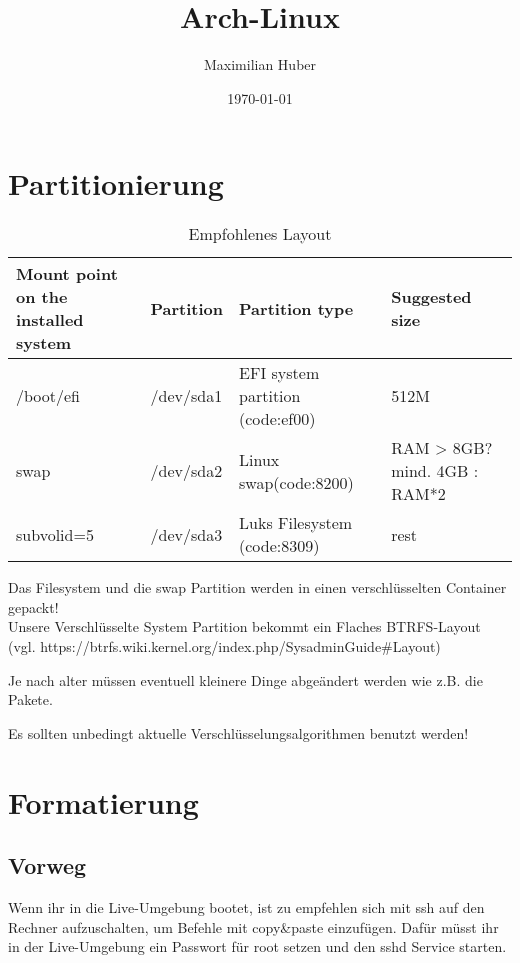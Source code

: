 \documentclass[11pt,a4paper]{article}
\author{Maximilian Huber}
\title{Arch-Linux}
\date{\today}
\begin{document}
\begin{titlepage}
\maketitle
\thispagestyle{empty}
\end{titlepage}

\tableofcontents
\thispagestyle{empty}	
\cleardoublepage
\setcounter{page}{1}

\section{Partitionierung}
\begin{table}[h]
\begin{tabular}{|p{3cm}|p{3cm}|p{3cm}| p{3cm} |}
\hline
Mount point on the installed system & Partition & Partition type   &  Suggested size \\ \hline
/boot/efi & /dev/sda1  & EFI system partition (code:ef00)  & 512M \\ \hline
swap & /dev/sda2  & Linux swap(code:8200)  & RAM > 8GB? mind. 4GB : RAM*2 \\ \hline
subvolid=5 & /dev/sda3  & Luks Filesystem (code:8309)  & rest  \\ \hline
\end{tabular}
\caption{Empfohlenes Layout}
\end{table}

Das Filesystem und die swap Partition werden in einen verschlüsselten Container gepackt!\\

Unsere Verschlüsselte System Partition bekommt ein Flaches BTRFS-Layout (vgl. https://btrfs.wiki.kernel.org/index.php/SysadminGuide\#Layout)

Je nach alter müssen eventuell kleinere Dinge abgeändert werden wie z.B. die Pakete.

Es sollten unbedingt aktuelle Verschlüsselungsalgorithmen benutzt werden!
\section{Formatierung}
\subsection{Vorweg}
Wenn ihr in die Live-Umgebung bootet, ist zu empfehlen sich mit ssh auf den Rechner aufzuschalten, um Befehle mit copy\&paste einzufügen.
Dafür müsst ihr in der Live-Umgebung ein Passwort für root setzen und den sshd Service starten.
\end{document}
